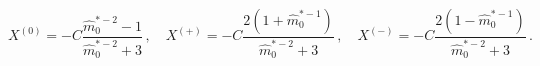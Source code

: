 \begin{equation}
X^{(0)}=-C{\frac{\hat{m}_{0}^{\ast -2}-1}{\hat{m}_{0}^{\ast -2}+3}}\,,\quad
X^{(+)}=-C{\frac{2(1+\hat{m}_{0}^{\ast -1})}{\hat{m}_{0}^{\ast -2}+3}}%
\,,\quad X^{(-)}=-C{\frac{2(1-\hat{m}_{0}^{\ast -1})}{\hat{m}_{0}^{\ast -2}+3%
}}\,.\quad   \label{eq:Neumann_X}
\end{equation}

